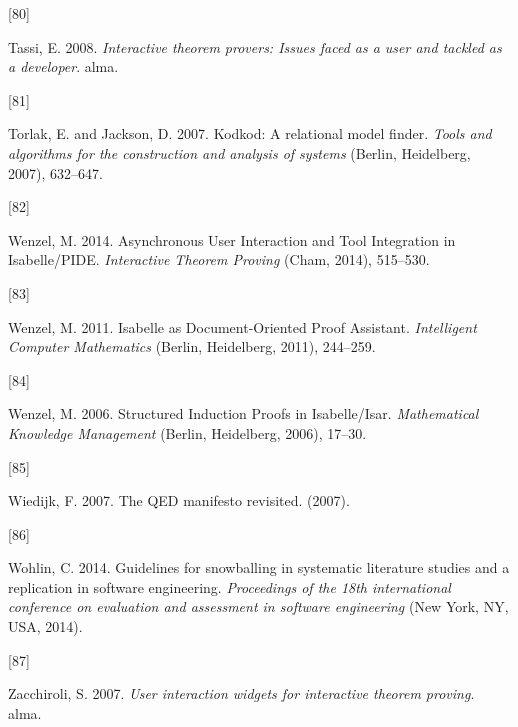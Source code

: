 \documentclass[
]{article}
\newlength{\cslhangindent}
\newlength{\csllabelwidth}
\newlength{\cslentryspacingunit} %
\newenvironment{CSLReferences}[2] %
 {%
  \setlength{\parindent}{0pt}
  \ifodd #1
  \let\oldpar\par
  \def\par{\hangindent=\cslhangindent\oldpar}
  \fi
  \setlength{\parskip}{#2\cslentryspacingunit}
 }%
 {}
\newcommand{\CSLLeftMargin}[1]{\parbox[t]{\csllabelwidth}{#1}}
\newcommand{\CSLRightInline}[1]{\parbox[t]{\linewidth - \csllabelwidth}{#1}\break}
\begin{document}
\begin{CSLReferences}{0}{0}
\leavevmode{}%
\CSLLeftMargin{{[}80{]} }
\CSLRightInline{Tassi, E. 2008. \emph{Interactive theorem provers:
Issues faced as a user and tackled as a developer}. alma.}

\leavevmode{}%
\CSLLeftMargin{{[}81{]} }
\CSLRightInline{Torlak, E. and Jackson, D. 2007. Kodkod: A relational
model finder. \emph{Tools and algorithms for the construction and
analysis of systems} (Berlin, Heidelberg, 2007), 632--647.}

\leavevmode{}%
\CSLLeftMargin{{[}82{]} }
\CSLRightInline{Wenzel, M. 2014. Asynchronous {User} {Interaction} and
{Tool} {Integration} in {Isabelle}/{PIDE}. \emph{Interactive {Theorem}
{Proving}} (Cham, 2014), 515--530.}

\leavevmode{}%
\CSLLeftMargin{{[}83{]} }
\CSLRightInline{Wenzel, M. 2011. Isabelle as {Document}-{Oriented}
{Proof} {Assistant}. \emph{Intelligent {Computer} {Mathematics}}
(Berlin, Heidelberg, 2011), 244--259.}

\leavevmode{}%
\CSLLeftMargin{{[}84{]} }
\CSLRightInline{Wenzel, M. 2006. Structured {Induction} {Proofs} in
{Isabelle}/{Isar}. \emph{Mathematical {Knowledge} {Management}} (Berlin,
Heidelberg, 2006), 17--30.}

\leavevmode{}%
\CSLLeftMargin{{[}85{]} }
\CSLRightInline{Wiedijk, F. 2007. The QED manifesto revisited. (2007).}

\leavevmode{}%
\CSLLeftMargin{{[}86{]} }
\CSLRightInline{Wohlin, C. 2014. Guidelines for snowballing in
systematic literature studies and a replication in software engineering.
\emph{Proceedings of the 18th international conference on evaluation and
assessment in software engineering} (New York, NY, USA, 2014).}

\leavevmode{}%
\CSLLeftMargin{{[}87{]} }
\CSLRightInline{Zacchiroli, S. 2007. \emph{User interaction widgets for
interactive theorem proving}. alma.}

\end{CSLReferences}
\end{document}
